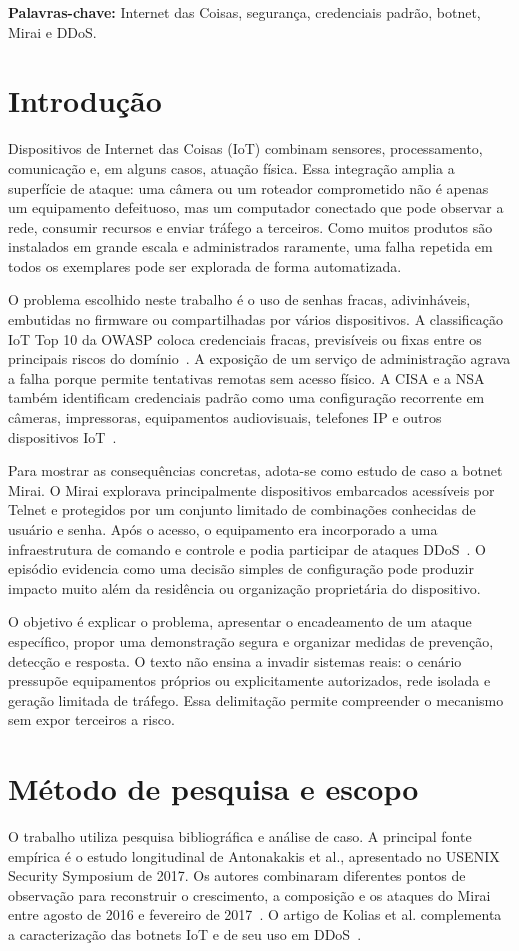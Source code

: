 \documentclass[11pt,a4paper]{article}
\begin{document}
\noindent\textbf{Palavras-chave:} Internet das Coisas, segurança, credenciais padrão, botnet, Mirai e DDoS.

\section{Introdução}
Dispositivos de Internet das Coisas (IoT) combinam sensores, processamento, comunicação e, em alguns casos, atuação física. Essa integração amplia a superfície de ataque: uma câmera ou um roteador comprometido não é apenas um equipamento defeituoso, mas um computador conectado que pode observar a rede, consumir recursos e enviar tráfego a terceiros. Como muitos produtos são instalados em grande escala e administrados raramente, uma falha repetida em todos os exemplares pode ser explorada de forma automatizada.

O problema escolhido neste trabalho é o uso de senhas fracas, adivinháveis, embutidas no firmware ou compartilhadas por vários dispositivos. A classificação IoT Top 10 da OWASP coloca credenciais fracas, previsíveis ou fixas entre os principais riscos do domínio~\cite{owasp2018}. A exposição de um serviço de administração agrava a falha porque permite tentativas remotas sem acesso físico. A CISA e a NSA também identificam credenciais padrão como uma configuração recorrente em câmeras, impressoras, equipamentos audiovisuais, telefones IP e outros dispositivos IoT~\cite{cisa2023}.

Para mostrar as consequências concretas, adota-se como estudo de caso a botnet Mirai. O Mirai explorava principalmente dispositivos embarcados acessíveis por Telnet e protegidos por um conjunto limitado de combinações conhecidas de usuário e senha. Após o acesso, o equipamento era incorporado a uma infraestrutura de comando e controle e podia participar de ataques DDoS~\cite{antonakakis2017}. O episódio evidencia como uma decisão simples de configuração pode produzir impacto muito além da residência ou organização proprietária do dispositivo.

O objetivo é explicar o problema, apresentar o encadeamento de um ataque específico, propor uma demonstração segura e organizar medidas de prevenção, detecção e resposta. O texto não ensina a invadir sistemas reais: o cenário pressupõe equipamentos próprios ou explicitamente autorizados, rede isolada e geração limitada de tráfego. Essa delimitação permite compreender o mecanismo sem expor terceiros a risco.

\section{Método de pesquisa e escopo}
O trabalho utiliza pesquisa bibliográfica e análise de caso. A principal fonte empírica é o estudo longitudinal de Antonakakis et al., apresentado no USENIX Security Symposium de 2017. Os autores combinaram diferentes pontos de observação para reconstruir o crescimento, a composição e os ataques do Mirai entre agosto de 2016 e fevereiro de 2017~\cite{antonakakis2017}. O artigo de Kolias et al. complementa a caracterização das botnets IoT e de seu uso em DDoS~\cite{kolias2017}.
\end{document}
